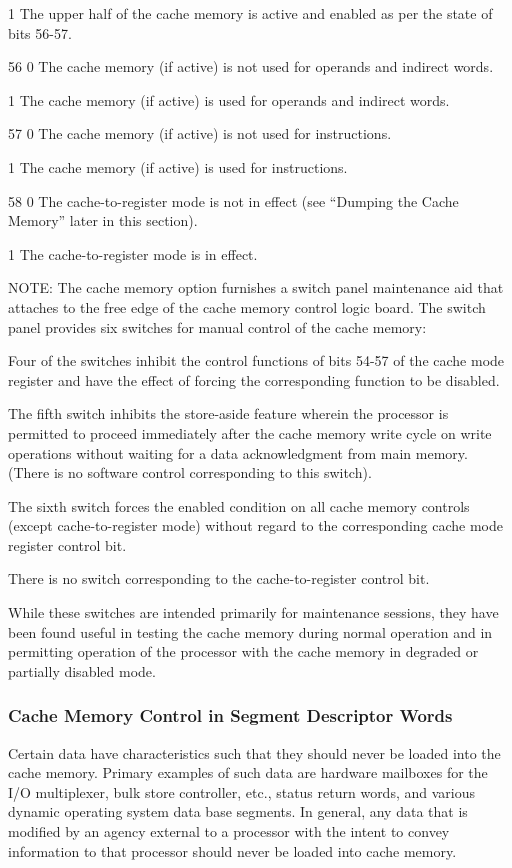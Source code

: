 1 The upper half of the cache memory is active and enabled as per the state of
bits 56-57.

56 0 The cache memory (if active) is not used for operands and indirect words.

1 The cache memory (if active) is used for operands and indirect words.

57 0 The cache memory (if active) is not used for instructions.

1 The cache memory (if active) is used for instructions.

58 0 The cache-to-register mode is not in effect (see {``}Dumping the Cache
Memory'' later in this section).

1 The cache-to-register mode is in effect.


NOTE: The cache memory option furnishes a switch panel maintenance aid that
attaches to the free edge of the cache memory control logic board. The switch
panel provides six switches for manual control of the cache memory:


Four of the switches inhibit the control functions of bits 54-57 of the cache
mode register and have the effect of forcing the corresponding function to be
disabled.


The fifth switch inhibits the store-aside feature wherein the processor is
permitted to proceed immediately after the cache memory write cycle on write
operations without waiting for a data acknowledgment from main memory. (There
is no software control corresponding to this switch).


The sixth switch forces the enabled condition on all cache memory controls
(except cache-to-register mode) without regard to the corresponding cache mode
register control bit.

There is no switch corresponding to the cache-to-register control bit.

While these switches are intended primarily for maintenance sessions, they have been found useful in testing the cache memory during normal operation and in permitting operation of the processor with the cache memory in degraded or partially disabled mode.  

\subsubsection{Cache Memory Control in Segment Descriptor Words}

Certain data have characteristics such that they should never be loaded into
the cache memory. Primary examples of such data are hardware mailboxes for the
I/O multiplexer, bulk store controller, etc., status return words, and various
dynamic operating system data base segments. In general, any data that is
modified by an agency external to a processor with the intent to convey
information to that processor should never be loaded into cache memory.  


